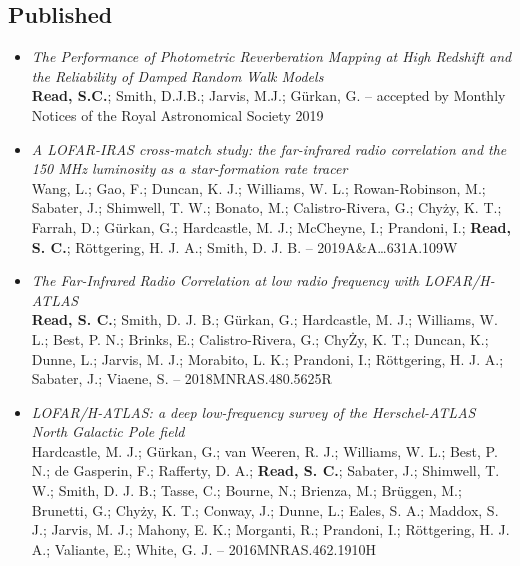 \documentclass[letterpaper]{twentysecondcv} %
\begin{document}
\begin{finalpages}
\subsection{Published}
\begin{itemize}
     \item \textit{The Performance of Photometric Reverberation Mapping at High Redshift
and the Reliability of Damped Random Walk Models}\\{\small \textbf{Read, S.C.}; Smith, D.J.B.; Jarvis, M.J.; Gürkan, G. -- accepted by Monthly Notices of the Royal Astronomical Society 2019}
 \item \textit{A LOFAR-IRAS cross-match study: the far-infrared radio correlation and
the 150 MHz luminosity as a star-formation rate tracer}\\{\small Wang, L.; Gao, F.; Duncan, K. J.; Williams, W. L.; Rowan-Robinson, M.;
Sabater, J.; Shimwell, T. W.; Bonato, M.; Calistro-Rivera, G.; Chyży, K.
T.; Farrah, D.; Gürkan, G.; Hardcastle, M. J.; McCheyne, I.; Prandoni,
I.; \textbf{Read, S. C.}; Röttgering, H. J. A.; Smith, D. J. B. -- 2019A\&A\ldots631A.109W}
 \item \textit{The Far-Infrared Radio Correlation at low radio frequency with
LOFAR/H-ATLAS}\\{\small \textbf{Read, S. C.}; Smith, D. J. B.; Gürkan, G.; Hardcastle, M. J.;
Williams, W. L.; Best, P. N.; Brinks, E.; Calistro-Rivera, G.; ChyŻy, K.
T.; Duncan, K.; Dunne, L.; Jarvis, M. J.; Morabito, L. K.; Prandoni, I.;
Röttgering, H. J. A.; Sabater, J.; Viaene, S. -- 2018MNRAS.480.5625R}
 \item \textit{LOFAR/H-ATLAS: a deep low-frequency survey of the Herschel-ATLAS North
Galactic Pole field}\\{\small Hardcastle, M. J.; Gürkan, G.; van Weeren, R. J.; Williams, W. L.; Best,
P. N.; de Gasperin, F.; Rafferty, D. A.; \textbf{Read, S. C.}; Sabater,
J.; Shimwell, T. W.; Smith, D. J. B.; Tasse, C.; Bourne, N.; Brienza,
M.; Brüggen, M.; Brunetti, G.; Chyży, K. T.; Conway, J.; Dunne, L.;
Eales, S. A.; Maddox, S. J.; Jarvis, M. J.; Mahony, E. K.; Morganti, R.;
Prandoni, I.; Röttgering, H. J. A.; Valiante, E.; White, G. J. -- 2016MNRAS.462.1910H}
\end{itemize}


\end{finalpages}
\end{document}
